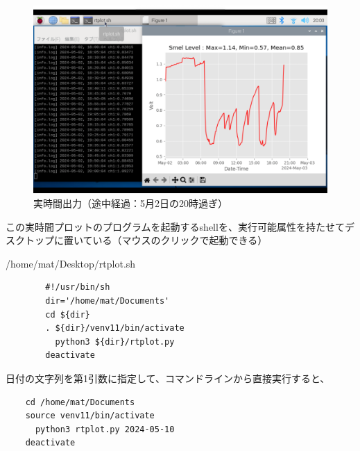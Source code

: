 \documentclass[12pt,a4j]{jsbook}
\begin{document}
\begin{figure}[htbp]
	\begin{minipage}[b]{1.0\linewidth}
		\centering
		\includegraphics[keepaspectratio, scale=0.26]{figs/png/screen2.png}
		\caption{実時間出力（途中経過：5月2日の20時過ぎ）}
	\end{minipage}
\end{figure}

この実時間プロットのプログラムを起動するshellを、実行可能属性を持たせてデスクトップに置いている（マウスのクリックで起動できる）

\begin{spacing}{0.95}
\begin{itembox}[l]{/home/mat/Desktop/rtplot.sh}
\begin{verbatim}
		#!/usr/bin/sh
		dir='/home/mat/Documents'
		cd ${dir}
		. ${dir}/venv11/bin/activate
		  python3 ${dir}/rtplot.py
		deactivate
\end{verbatim}
\end{itembox}
\end{spacing}

日付の文字列を第1引数に指定して、コマンドラインから直接実行すると、

\begin{spacing}{0.95}
\begin{verbatim}
	cd /home/mat/Documents
	source venv11/bin/activate
	  python3 rtplot.py 2024-05-10
	deactivate
\end{verbatim}
\end{spacing}
\end{document}
